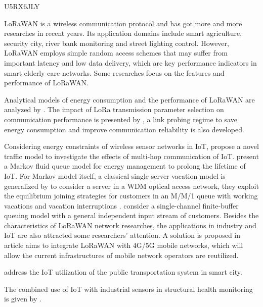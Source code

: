 \cite{yang_smart_2018} U5RX6JLY

LoRaWAN is a wireless communication protocol and has got more and more researches in recent years.
Its application domains include smart agriculture,
	security city,
	river bank monitoring and street lighting control.
However,
	LoRaWAN employs simple random access schemes that may suffer from important latency and low data delivery,
	which are key performance indicators in smart elderly care networks.
Some researches focus on the features and performance of LoRaWAN.

Analytical models of energy consumption and the performance of LoRaWAN are analyzed by \citet{casals_modeling_2017}.
The impact of LoRa transmission parameter selection on communication performance is presented by \citet{bor_lora_2017},
	a link probing regime to save energy consumption and improve communication reliability is also developed.

Considering energy constraints of wireless sensor networks in IoT,
	\citet{al-turjman_mobile_2017} propose a novel traffic model to investigate the effects of multi-hop communication of IoT.
\citet{tunc_markov_2017} present a Markov fluid queue model for energy management to prolong the lifetime of IoT.
For Markov model itself,
	a classical single server vacation model is generalized by \citet{servi_m/m/1_2002} to consider a server in a WDM optical access network,
	they exploit the equilibrium joining strategies for customers in an M/M/1 queue with working vacations and vacation interruptions \cite{li_equilibrium_2016}.
\citet{kempa_transient_2018} consider a single-channel finite-buffer queuing model with a general independent input stream of customers.
Besides the characteristics of LoRaWAN network researches,
	the applications in industry and IoT are also attracted some researchers’ attention.
A solution is proposed in article \cite{navarro-ortiz_integration_2018} aims to integrate LoRaWAN with 4G/5G mobile networks,
	which will allow the current infrastructures of mobile network operators are reutilized.


\citet{cruz_algorithm_2019} address the IoT utilization of the public transportation system in smart city.

The combined use of IoT with industrial sensors in structural health monitoring is given by \citet{alonso_middleware_2018}.


